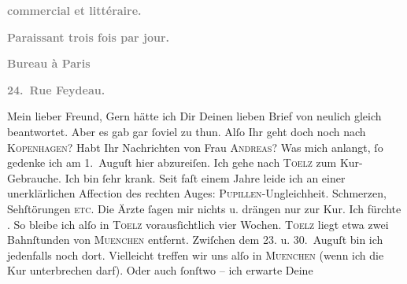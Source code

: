 \begin{ledgroupsized}[t]{13cm}
           \begin{otherlanguage}{french}\textcolor{gray}{\textbf{commercial et littéraire.}}\end{otherlanguage}\pend
           \pstart
           \begin{otherlanguage}{french}\textcolor{gray}{\textbf{\textbf{Paraissant trois fois par jour.}}}\end{otherlanguage}\pend
           \pstart
           \begin{otherlanguage}{french}\textcolor{gray}{\textbf{\textbf{Bureau à Paris}}}\end{otherlanguage}\pend
           \pstart
           \begin{otherlanguage}{french}\textcolor{gray}{\textbf{\textbf{24. Rue Feydeau.}}}\end{otherlanguage}\pend
           \pstart\center{}Mein lieber Freund,\pend\pstart
           Gern hätte ich Dir Deinen lieben Brief von neulich gleich beantwortet. Aber es gab
               gar ſoviel zu thun.\pend
           \pstart
           Alſo Ihr geht doch noch nach \textsc{Kopenhagen}? Habt Ihr Nachrichten von Frau \textsc{Andreas}?\pend
           \pstart
           Was mich anlangt, ſo gedenke ich am 1. Auguſt hier
               abzureiſen. Ich gehe nach \textsc{Toelz} zum Kur-Gebrauche. Ich bin ſehr krank. Seit faſt einem Jahre leide ich an einer
               unerklärlichen Affection des rechten Auges: \textsc{Pupillen}-Ungleichheit. Schmerzen, {\pb}Sehſtörungen \textsc{etc}. Die  Ärzte ſagen mir nichts u. drängen nur zur Kur.
               Ich fürchte \label{K_L02741-1v}\label{K_L02741-1h}.\pend
           \pstart
           So bleibe ich alſo in \textsc{Toelz} vorausſichtlich vier Wochen. \textsc{Toelz} liegt etwa zwei Bahnſtunden von \textsc{Muenchen} entfernt. Zwiſchen dem 23. u. 30. Auguſt bin ich jedenfalls noch dort. Vielleicht
               treffen wir uns alſo in \textsc{Muenchen} (wenn ich die Kur unterbrechen darf). Oder auch ſonſtwo – ich erwarte Deine

\end{ledgroupsized}
